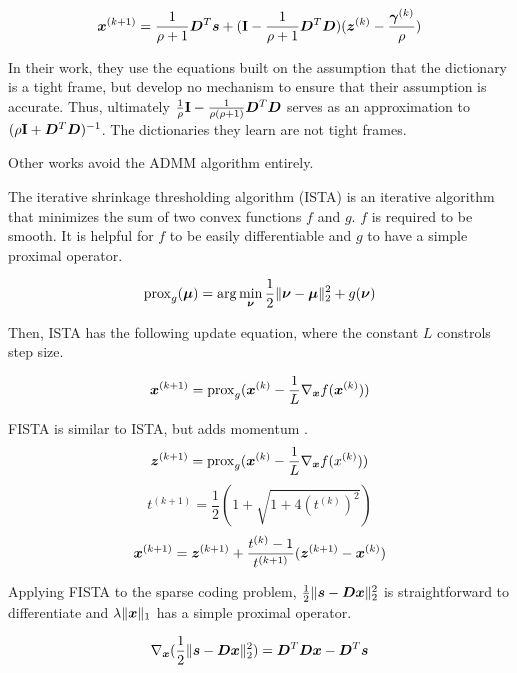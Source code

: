\begin{equation}
\bm{x}^{(k + 1)} = \frac{1}{\rho + 1}\bm{D}^T\bm{s} + ({\bf I} - \frac{1}{\rho + 1}\bm{D}^T\bm{D})(\bm{z}^{(k)} - \frac{\bm{\gamma}^{(k)}}{\rho})
\end{equation}

In their work, they use the equations built on the assumption that the dictionary is a tight frame, but develop no mechanism to ensure that their assumption is accurate. Thus, ultimately $\frac{1}{\rho}{\bf I} - \frac{1}{\rho(\rho + 1)}\bm{D}^T\bm{D}$ serves as an approximation to $(\rho{\bf I} + \bm{D}^T\bm{D})^{-1}$. The dictionaries they learn are not tight frames.

Other works avoid the ADMM algorithm entirely.

The iterative shrinkage thresholding algorithm (ISTA) is an iterative algorithm that minimizes the sum of two convex functions $f$ and $g$. $f$ is required to be smooth. It is helpful for $f$ to be easily differentiable and $g$ to have a simple proximal operator.

\begin{equation}
\operatorname{prox}_g(\bm{\mu}) = \arg \min_{\bm{\nu}} \frac{1}{2}\|\bm{\nu} - \bm{\mu}\|_2^2 + g(\bm{\nu})
\end{equation}

Then, ISTA has the following update equation, where the constant $L$ constrols step size.

\begin{equation}
\bm{x}^{(k + 1)} = \operatorname{prox}_g(\bm{x}^{(k)} - \frac{1}{L}\nabla_{\bm{x}} f(\bm{x}^{(k)}))
\end{equation}

FISTA is similar to ISTA, but adds momentum \cite{beck2009fast}.
\begin{equation}
\bm{z}^{(k + 1)} = \operatorname{prox}_g(\bm{x}^{(k)} - \frac{1}{L}\nabla_{\bm{x}}f(x^{(k)}))
\end{equation}
\begin{equation}
t^{(k + 1)} = \frac{1}{2}(1 + \sqrt{1 + 4(t^{(k)})^2})
\end{equation}
\begin{equation}
\bm{x}^{(k + 1)} = \bm{z}^{(k + 1)} + \frac{t^{(k)} - 1}{t^{(k + 1)}}(\bm{z}^{(k + 1)} - \bm{x}^{(k)})
\end{equation}

Applying FISTA to the sparse coding problem, $\frac{1}{2}\|\bm{s} - \bm{D}\bm{x}\|_2^2$ is straightforward to differentiate and $\lambda\|\bm{x}\|_1$ has a simple proximal operator.

\begin{equation}
\nabla_{\bm{x}}(\frac{1}{2}\|\bm{s} - \bm{D}\bm{x}\|_2^2) = \bm{D}^T\bm{D}\bm{x} - \bm{D}^T\bm{s}
\end{equation}

